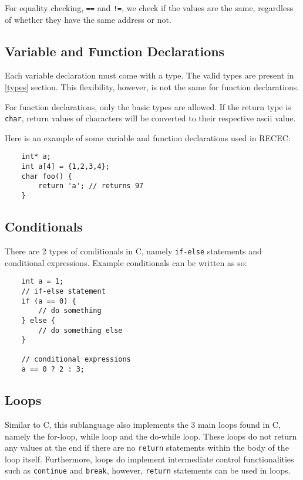 \documentclass[a4paper]{article}
\begin{document}
For equality checking, \texttt{==} and \texttt{!=}, we check if the values are the same, regardless of whether they have the same address or not.

\subsection{Variable and Function Declarations}
Each variable declaration must come with a type. The valid types are present in \ref{types} section. This flexibility, however, is not the same for function declarations. 

For function declarations, only the basic types are allowed. If the return type is \texttt{char}, return values of characters will be converted to their respective ascii value. 

Here is an example of some variable and function declarations used in RECEC: 

\begin{verbatim}
	int* a;
	int a[4] = {1,2,3,4};
	char foo() {
		return 'a'; // returns 97
	}
\end{verbatim}

\subsection{Conditionals}

There are 2 types of conditionals in C, namely \texttt{if-else} statements and conditional expressions. Example conditionals can be written as so:

\begin{verbatim}
	int a = 1;
	// if-else statement
	if (a == 0) {
		// do something
	} else {
		// do something else
	}

	// conditional expressions
	a == 0 ? 2 : 3;
\end{verbatim}

\subsection{Loops}

Similar to C, this sublanguage also implements the 3 main loops found in C, namely the for-loop, while loop and the do-while loop. These loops do not return any values at the end if there are no \texttt{return} statements within the body of the loop itself. Furthermore, loops do implement intermediate control functionalities such as \texttt{continue} and \texttt{break}, however, \texttt{return} statements can be used in loops. 
\end{document}
